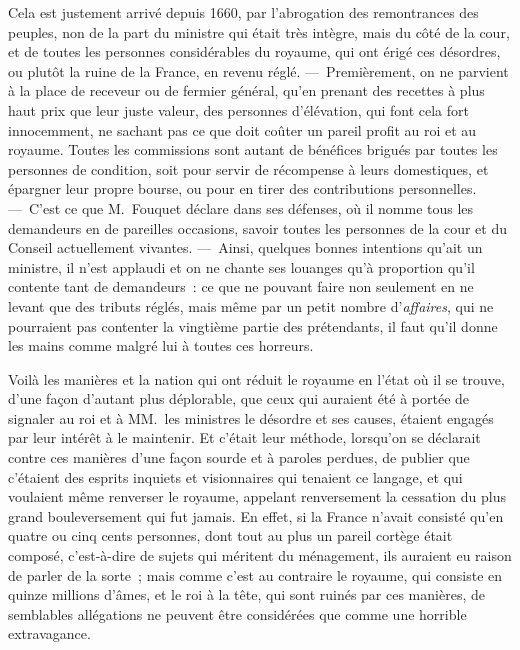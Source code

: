 \documentclass[french,twoside]{book} %
\begin{document}
Cela est justement arrivé depuis 1660, par l’abrogation des remontrances des peuples, non de la part du ministre qui était très intègre, mais du côté de la cour, et de toutes les personnes considérables du royaume, qui ont érigé ces désordres, ou plutôt la ruine de la France, en revenu réglé. — Premièrement, on ne parvient à la place de receveur ou de fermier général, qu’en prenant des recettes à plus haut prix que leur juste valeur, des personnes d’élévation, qui font cela fort innocemment, ne sachant pas ce que doit coûter un pareil profit au roi et au royaume. Toutes les commissions sont autant de bénéfices brigués par toutes les personnes de condition, soit pour servir de récompense à leurs domestiques, et épargner leur propre bourse, ou pour en tirer des contributions personnelles. — C’est ce que M. Fouquet déclare dans ses défenses, où il nomme tous les demandeurs en de pareilles occasions, savoir toutes les personnes de la cour et du Conseil actuellement vivantes. — Ainsi, quelques bonnes intentions qu’ait un ministre, il n’est applaudi et on ne chante ses louanges qu’à proportion qu’il contente tant de demandeurs : ce que ne pouvant faire non seulement en ne levant que des tributs réglés, mais même par un petit nombre d’{\itshape affaires}, qui ne pourraient pas contenter la vingtième partie des prétendants, il faut qu’il donne les mains comme malgré lui à toutes ces horreurs.\par
Voilà les manières et la nation qui ont réduit le royaume en l’état où il se trouve, d’une façon d’autant plus déplorable, que ceux qui auraient été à portée de signaler au roi et à MM. les ministres le désordre et ses causes, étaient engagés par leur intérêt à le maintenir. Et c’était leur méthode, lorsqu’on se déclarait contre ces manières d’une façon sourde et à paroles perdues, de publier que c’étaient des esprits inquiets et visionnaires qui tenaient ce langage, et qui voulaient même renverser le royaume, appelant renversement la cessation du plus grand bouleversement qui fut jamais. En effet, si la France n’avait consisté qu’en quatre ou cinq cents personnes, dont tout au plus un pareil cortège était composé, c’est-à-dire de sujets qui méritent du ménagement, ils auraient eu raison de parler de la sorte ; mais comme c’est au contraire le royaume, qui consiste en quinze millions d’âmes, et le roi à la tête, qui sont ruinés par ces manières, de semblables allégations ne peuvent être considérées que comme une horrible extravagance.\par
\end{document}
